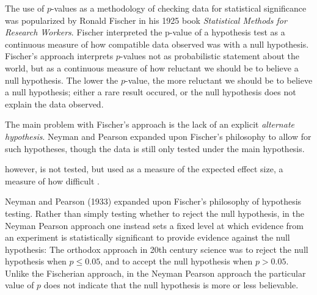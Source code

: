 The use of $p$-values as a methodology of checking data for statistical significance was popularized by Ronald Fischer in his 1925 book \emph{Statistical Methods for Research Workers}. Fischer interpreted the p-value of a hypothesis test as a continuous measure of how compatible data observed was with a null hypothesis. Fischer's approach interprets $p$-values not as probabilistic statement about the world, but as a continuous measure of how reluctant we should be to believe a null hypothesis. The lower the $p$-value, the more reluctant we should be to believe a null hypothesis; either a rare result occured, or the null hypothesis does not explain the data observed.

The main problem with Fischer's approach is the lack of an explicit \emph{alternate hypothesis}. Neyman and Pearson expanded upon Fischer's philosophy to allow for such hypotheses, though the data is still only tested under the main hypothesis.

 however, is not tested, but used as a measure of the expected effect size, a measure of how difficult .

Neyman and Pearson (1933) expanded upon Fischer's philosophy of hypothesis testing. Rather than simply testing whether to reject the null hypothesis, in the Neyman Pearson approach one instead sets a fixed level at which evidence from an experiment is statistically significant to provide evidence against the null hypothesis: The orthodox approach in 20th century science was to reject the null hypothesis when $p \leq 0.05$, and to accept the null hypothesis when $p > 0.05$. Unlike the Fischerian approach, in the Neyman Pearson approach the particular value of $p$ does not indicate that the null hypothesis is more or less believable.

